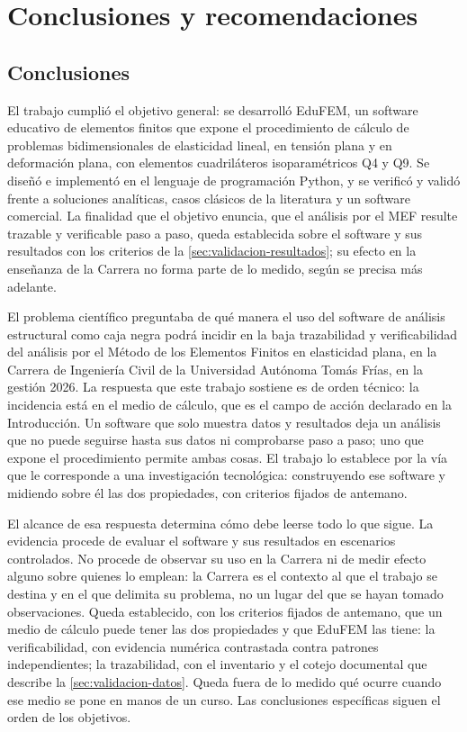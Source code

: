 \chapter*{Conclusiones y recomendaciones}

\section*{Conclusiones}

El trabajo cumplió el objetivo general: se desarrolló EduFEM, un software educativo de elementos finitos que expone el procedimiento de cálculo de problemas bidimensionales de elasticidad lineal, en tensión plana y en deformación plana, con elementos cuadriláteros isoparamétricos Q4 y Q9. Se diseñó e implementó en el lenguaje de programación Python, y se verificó y validó frente a soluciones analíticas, casos clásicos de la literatura y un software comercial. La finalidad que el objetivo enuncia, que el análisis por el MEF resulte trazable y verificable paso a paso, queda establecida sobre el software y sus resultados con los criterios de la \autoref{sec:validacion-resultados}; su efecto en la enseñanza de la Carrera no forma parte de lo medido, según se precisa más adelante.

El problema científico preguntaba de qué manera el uso del software de análisis estructural como caja negra podrá incidir en la baja trazabilidad y verificabilidad del análisis por el Método de los Elementos Finitos en elasticidad plana, en la Carrera de Ingeniería Civil de la Universidad Autónoma Tomás Frías, en la gestión 2026. La respuesta que este trabajo sostiene es de orden técnico: la incidencia está en el medio de cálculo, que es el campo de acción declarado en la Introducción. Un software que solo muestra datos y resultados deja un análisis que no puede seguirse hasta sus datos ni comprobarse paso a paso; uno que expone el procedimiento permite ambas cosas. El trabajo lo establece por la vía que le corresponde a una investigación tecnológica: construyendo ese software y midiendo sobre él las dos propiedades, con criterios fijados de antemano.

El alcance de esa respuesta determina cómo debe leerse todo lo que sigue. La evidencia procede de evaluar el software y sus resultados en escenarios controlados. No procede de observar su uso en la Carrera ni de medir efecto alguno sobre quienes lo emplean: la Carrera es el contexto al que el trabajo se destina y en el que delimita su problema, no un lugar del que se hayan tomado observaciones. Queda establecido, con los criterios fijados de antemano, que un medio de cálculo puede tener las dos propiedades y que EduFEM las tiene: la verificabilidad, con evidencia numérica contrastada contra patrones independientes; la trazabilidad, con el inventario y el cotejo documental que describe la \autoref{sec:validacion-datos}. Queda fuera de lo medido qué ocurre cuando ese medio se pone en manos de un curso. Las conclusiones específicas siguen el orden de los objetivos.

